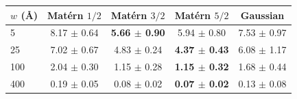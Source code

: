 \begin{tabular}{lcccc}
\toprule
$w$ (\AA) & Mat\'ern $1/2$ & Mat\'ern $3/2$ & Mat\'ern $5/2$ & Gaussian \\
\midrule
5 & 8.17 $\pm$ 0.64 & \textbf{5.66 $\pm$ 0.90} & 5.94 $\pm$ 0.80 & 7.53 $\pm$ 0.97 \\
25 & 7.02 $\pm$ 0.67 & 4.83 $\pm$ 0.24 & \textbf{4.37 $\pm$ 0.43} & 6.08 $\pm$ 1.17 \\
100 & 2.04 $\pm$ 0.30 & 1.15 $\pm$ 0.28 & \textbf{1.15 $\pm$ 0.32} & 1.68 $\pm$ 0.44 \\
400 & 0.19 $\pm$ 0.05 & 0.08 $\pm$ 0.02 & \textbf{0.07 $\pm$ 0.02} & 0.13 $\pm$ 0.08 \\
\bottomrule
\end{tabular}
